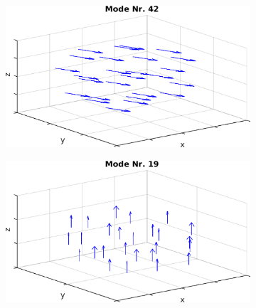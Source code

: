         \begin{figure}[!t]
          \centering
          \begin{subfigure}[t]{0.325\textwidth}
            \centering
            \includegraphics[width=\textwidth,height=0.8\textwidth]{figs/auswertung/manipulation/erstensungestModeNr42.png}
          \end{subfigure}
          \begin{subfigure}[t]{0.325\textwidth}
            \centering
            \includegraphics[width=\textwidth,height=0.8\textwidth]{figs/auswertung/manipulation/erstensungestModeNr19.png}

\end{subfigure}
\end{figure}

